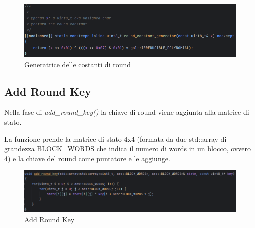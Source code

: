 \begin{figure}[H] %
	\centering
	\includegraphics[width=1\textwidth, height=1\textheight, keepaspectratio]{./images/code/cpp/galois_math/round_constant_generator.PNG}
	\caption{Generatrice delle costanti di round}
	\label{fig:round_constant_generator}
\end{figure}



\subsection{Add Round Key}

\textsf{\small Nella fase di \emph{add\_round\_key()} la chiave di round viene aggiunta alla matrice di stato.}

\textsf{\small La funzione prende la matrice di stato 4x4 (formata da due std::array di grandezza BLOCK\_WORDS che indica il numero di words in un blocco, ovvero 4) e la chiave del round come puntatore e le aggiunge.}

\begin{figure}[H]
	\centering
	\includegraphics[width=1\textwidth, height=1\textheight, keepaspectratio]{./images/code/cpp/encryption/add_round_key.PNG}
	\caption{Add Round Key}
	\label{fig:add_round_key}
\end{figure}

